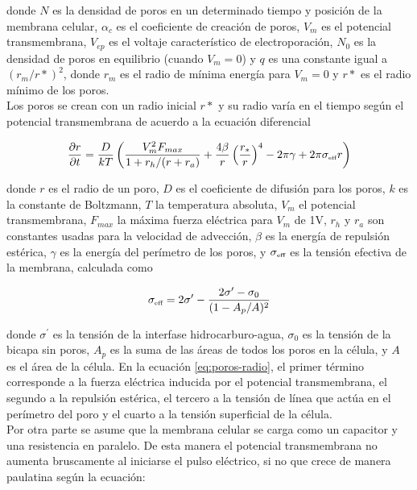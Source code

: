 \documentclass[a4paper,10pt]{article}
\begin{document}
donde $N$ es la densidad de poros en un determinado tiempo y posición de la membrana celular, $\alpha_c$ es el coeficiente de creación de poros, $V_m$ es el potencial transmembrana, $V_{ep}$ es el voltaje característico de electroporación, $N_0$ es la densidad de poros en equilibrio (cuando $V_m = 0$) y $q$ es una constante igual a $(r_m / r*)^2$, donde $r_m$ es el radio de mínima energía para $V_m = 0$ y $r*$ es el radio mínimo de los poros.\\

Los poros se crean con un radio inicial $r*$ y su radio varía en el tiempo según el potencial transmembrana de acuerdo a la ecuación diferencial

\begin{equation} \label{eq:poros-radio}
	\frac{\partial r}{\partial t} = \frac{D}{kT} \left( \frac{V_m^2 F_{max}}{1+r_h / (r+r_a)} + \frac{4 \beta}{r} \left(\frac{r_*}{r}\right)^4 - 2 \pi \gamma + 2 \pi \sigma_{\textrm{\tiny eff}} r\right)
\end{equation}

donde $r$ es el radio de un poro, $D$ es el coeficiente de difusión para los poros, $k$ es la constante de Boltzmann, $T$ la temperatura absoluta, $V_m$ el potencial transmembrana, $F_{max}$ la máxima fuerza eléctrica para $V_m$ de 1V, $r_h$ y $r_a$ son constantes usadas para la velocidad de advección, $\beta$ es la energía de repulsión estérica, $\gamma$ es la energía del perímetro de los poros, y $\sigma_{\textrm{\tiny eff}}$ es la tensión efectiva de la membrana, calculada como

\begin{equation}
	\sigma_{\textrm{\tiny eff}} = 2 \sigma^\prime - \frac{2 \sigma^\prime - \sigma_0}{(1 - A_p / A)^2}
\end{equation}

donde $\sigma^\prime$ es la tensión de la interfase hidrocarburo-agua, $\sigma_0$ es la tensión de la bicapa sin poros, $A_p$ es la suma de las áreas de todos los poros en la célula, y $A$ es el área de la célula. En la ecuación \ref{eq:poros-radio}, el primer término corresponde a la fuerza eléctrica inducida por el potencial transmembrana, el segundo a la repulsión estérica, el tercero a la tensión de línea que actúa en el perímetro del poro y el cuarto a la tensión superficial de la célula.\\

Por otra parte se asume que la membrana celular se carga como un capacitor y una resistencia en paralelo. De esta manera el potencial transmembrana no aumenta bruscamente al iniciarse el pulso eléctrico, si no que crece de manera paulatina según la ecuación: 
\end{document}
